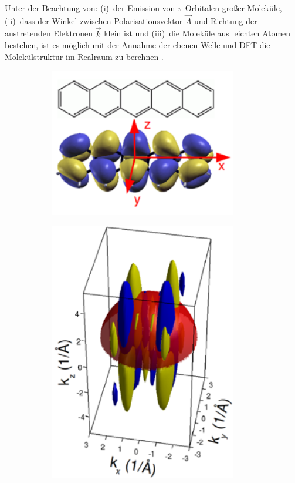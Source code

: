         Unter der Beachtung von: (i)~der Emission von $\pi$-Orbitalen großer Moleküle, (ii)~dass der Winkel zwischen Polarisationsvektor $\vec{A}$ und Richtung der austretenden Elektronen $\vec{k}$ klein ist und (iii)~die Moleküle aus leichten Atomen bestehen, ist es möglich mit der Annahme der ebenen Welle und DFT die Molekülstruktur im Realraum zu berchnen \cite{MM_2}.
        \begin{figure}
            \centering
            \begin{subfigure}{0.3\textwidth}
                \centering
                \includegraphics[width=0.9\textwidth]{DFT1.PNG}
                \caption{}
                \label{fig:DFT1}
            \end{subfigure}
            \begin{subfigure}{0.3\textwidth}
                \centering
                \includegraphics[width=0.9\textwidth]{DFT2.PNG}

\end{subfigure}
\end{figure}

